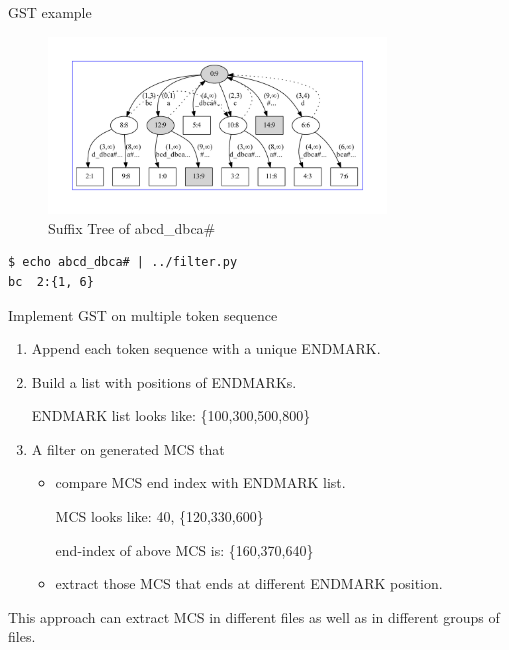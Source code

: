 \begin{frame}[fragile]{GST example}%

\begin{figure}
\caption{Suffix Tree of abcd\_dbca\#}
\includegraphics[width=0.8\textwidth,trim=40pt 40pt 40pt 40pt]{gst.pdf}
\end{figure}

\begin{lstlisting}
$ echo abcd_dbca# | ../filter.py
bc	2:{1, 6}
\end{lstlisting}

\end{frame}

\begin{frame}{Implement GST on multiple token sequence}
\begin{enumerate}
\item Append each token sequence with a unique ENDMARK.
\item Build a list with positions of ENDMARKs.

ENDMARK list looks like: \{100,300,500,800\}
\item A filter on generated MCS that 
\begin{itemize}
\item compare MCS end index with ENDMARK list.

MCS looks like: 40, \{120,330,600\}

end-index of above MCS is: \{160,370,640\}
\item extract those MCS that ends at different ENDMARK position.
\end{itemize}
\end{enumerate}

This approach can extract MCS in different \alert{files} as well as 
in different \alert{groups of files}.
\end{frame}


